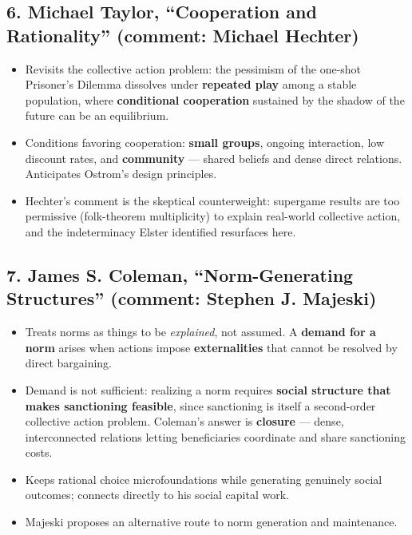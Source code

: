\documentclass[12pt]{article}
\begin{document}
\subsection*{6. Michael Taylor, ``Cooperation and Rationality'' (comment: Michael Hechter)}
\begin{itemize}[leftmargin=*, itemsep=3pt]
    \item Revisits the collective action problem: the pessimism of the one-shot
    Prisoner's Dilemma dissolves under \textbf{repeated play} among a stable
    population, where \textbf{conditional cooperation} sustained by the shadow
    of the future can be an equilibrium.
    \item Conditions favoring cooperation: \textbf{small groups}, ongoing
    interaction, low discount rates, and \textbf{community} --- shared beliefs
    and dense direct relations. Anticipates Ostrom's design principles.
    \item Hechter's comment is the skeptical counterweight: supergame results
    are too permissive (folk-theorem multiplicity) to explain real-world
    collective action, and the indeterminacy Elster identified resurfaces here.
\end{itemize}

\subsection*{7. James S. Coleman, ``Norm-Generating Structures'' (comment: Stephen J. Majeski)}
\begin{itemize}[leftmargin=*, itemsep=3pt]
    \item Treats norms as things to be \emph{explained}, not assumed. A
    \textbf{demand for a norm} arises when actions impose \textbf{externalities}
    that cannot be resolved by direct bargaining.
    \item Demand is not sufficient: realizing a norm requires \textbf{social
    structure that makes sanctioning feasible}, since sanctioning is itself a
    second-order collective action problem. Coleman's answer is
    \textbf{closure} --- dense, interconnected relations letting beneficiaries
    coordinate and share sanctioning costs.
    \item Keeps rational choice microfoundations while generating genuinely
    social outcomes; connects directly to his social capital work.
    \item Majeski proposes an alternative route to norm generation and
    maintenance.
\end{itemize}
\end{document}
